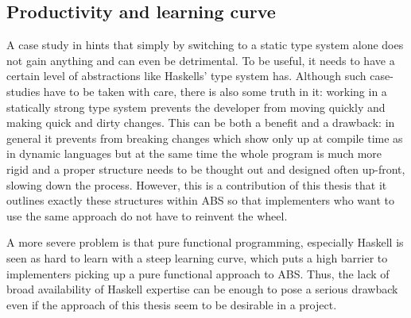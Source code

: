 
\subsection{Productivity and learning curve}
A case study in \cite{hanenberg_experiment_2010} hints that simply by switching to a static type system alone does not gain anything and can even be detrimental. To be useful, it needs to have a certain level of abstractions like Haskells' type system has. Although such case-studies have to be taken with care, there is also some truth in it: working in a statically strong type system prevents the developer from moving quickly and making quick and dirty changes. This can be both a benefit and a drawback: in general it prevents from breaking changes which show only up at compile time as in dynamic languages but at the same time the whole program is much more rigid and a proper structure needs to be thought out and designed often up-front, slowing down the process. However, this is a contribution of this thesis that it outlines exactly these structures within ABS so that implementers who want to use the same approach do not have to reinvent the wheel.

A more severe problem is that pure functional programming, especially Haskell is seen as hard to learn with a steep learning curve, which puts a high barrier to implementers picking up a pure functional approach to ABS. Thus, the lack of broad availability of Haskell expertise can be enough to pose a serious drawback even if the approach of this thesis seem to be desirable in a project.

